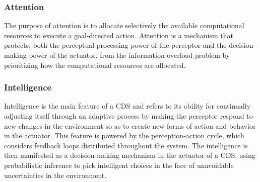 \documentclass[ENG,PhD]{cinvestav}
\begin{document}
\subsubsection*{Attention}
The purpose of attention is to allocate selectively the available computational resources to execute a goal-directed action.
Attention is a mechanism that protects, both the perceptual-processing power of the perceptor and the decision-making power of the actuator, from the information-overload problem by prioritizing how the computational resources are allocated.


\subsubsection*{Intelligence}
Intelligence is the main feature of a CDS and refers to its ability for continually adjusting itself through an adaptive process by making the perceptor respond to new changes in the environment so as to create new forms of action and behavior in the actuator.
This feature is powered by the perception-action cycle, which considers feedback loops distributed throughout the system.
The intelligence is then manifested as a decision-making mechanism in the actuator of a CDS, using probabilistic inference to pick intelligent choices in the face of unavoidable uncertainties in the environment.







 
%                                                              
\end{document}
